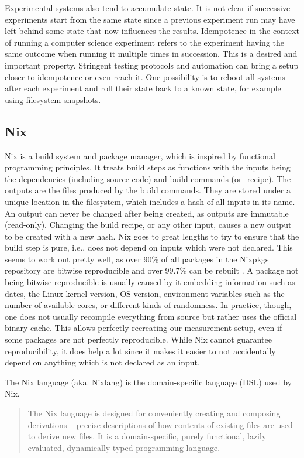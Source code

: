 Experimental systems also tend to accumulate state.
It is not clear if successive experiments start from the same state since a previous experiment run may have left behind some state that now influences the results.
Idempotence \cite{Idempotence} in the context of running a computer science experiment refers to the experiment having the same outcome when running it multiple times in succession.
This is a desired and important property.
Stringent testing protocols and automation can bring a setup closer to idempotence or even reach it.
One possibility is to reboot all systems after each experiment and roll their state back to a known state, for example using filesystem snapshots.

\subsection{Nix}
\label{Nix-explanation}
Nix is a build system and package manager, which is inspired by functional programming principles.
It treats build steps as functions with the inputs being the dependencies (including source code) and build commands (or -recipe).
The outputs are the files produced by the build commands.
They are stored under a unique location in the filesystem, which includes a hash of all inputs in its name.
An output can never be changed after being created, as outputs are immutable (read-only).
Changing the build recipe, or any other input, causes a new output to be created with a new hash.
Nix goes to great lengths to try to ensure that the build step is pure, i.e., does not depend on inputs which were not declared.
This seems to work out pretty well, as over 90\% of all packages in the Nixpkgs repository are bitwise reproducible and over 99.7\% can be rebuilt \cite{malka:hal-04913007}.
A package not being bitwise reproducible is usually caused by it embedding information such as dates, the Linux kernel version, OS version, environment variables such as the number of available cores, or different kinds of randomness.
In practice, though, one does not usually recompile everything from source but rather uses the official binary cache.
This allows perfectly recreating our measurement setup, even if some packages are not perfectly reproducible.
While Nix cannot guarantee reproducibility, it does help a lot since it makes it easier to not accidentally depend on anything which is not declared as an input.

The Nix language (aka. Nixlang) is the domain-specific language (DSL) used by Nix.
\blockquote[\cite{nixlang}]{The Nix language is designed for conveniently creating and composing derivations – precise descriptions of how contents of existing files are used to derive new files. It is a domain-specific, purely functional, lazily evaluated, dynamically typed programming language.}

